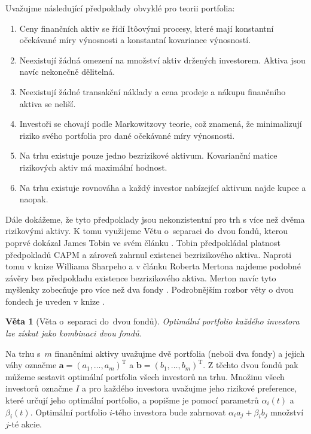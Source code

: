 \documentclass[a4paper,12pt]{report}
\newtheorem{veta}{Věta}
\theoremstyle{definition} \newtheorem{definice}[veta]{Definice}
\theoremstyle{remark}
\begin{document}
Uvažujme následující předpoklady obvyklé pro teorii portfolia:
\begin{enumerate}
\item \label{predpoklad_konstantnosti_vynosu_a_rizika} Ceny finančních aktiv se řídí It\^oovými procesy, které mají konstantní očekávané míry výnosnosti a konstantní kovariance výnosností. 
\item Neexistují žádná omezení na množství aktiv držených investorem. Aktiva jsou navíc nekonečně dělitelná.
\item Neexistují žádné transakční náklady a cena prodeje a nákupu finančního aktiva se neliší.
\item Investoři se chovají podle Markowitzovy teorie, což znamená, že minimalizují riziko svého portfolia pro dané očekávané míry výnosnosti.
\item \label{predpoklad_hodnost} Na trhu existuje pouze jedno bezrizikové aktivum. Kovarianční matice rizikových aktiv má maximální hodnost.
\item \label{predpoklad_konstantnosti_N} Na trhu existuje rovnováha a každý investor nabízející aktivum najde kupce a naopak.
\end{enumerate}

Dále dokážeme, že tyto předpoklady jsou nekonzistentní pro trh s více než dvěma rizikovými aktivy.
K tomu využijeme Větu o~separaci do~dvou fondů, kterou poprvé dokázal  James Tobin ve svém článku \cite{tobin}. 
Tobin předpokládal platnost předpokladů CAPM a zároveň zahrnul existenci bezrizikového aktiva.
Naproti tomu v knize Williama Sharpeho \cite{sharpe} a v článku Roberta Mertona \cite{merton} najdeme podobné závěry bez předpokladu existence bezrizikového aktiva.
Merton navíc tyto myšlenky zobecňuje pro více než dva fondy \cite{merton1973}.
Podrobnějším rozbor věty o dvou fondech je uveden v knize \cite{cass1970structure}.
\begin{veta}[Věta o~separaci do~dvou fondů]
Optimální portfolio každého investora lze získat jako kombinaci dvou fondů.
\end{veta}

Na trhu s~$m$ finančními aktivy uvažujme dvě portfolia (neboli dva fondy) a jejich váhy označme $\boldsymbol{a}=(a_1,\dots,a_m)^\mathrm{T}$ a $\boldsymbol{b}=(b_1,\dots,b_m)^\mathrm{T}$. Z těchto dvou fondů pak můžeme sestavit optimální portfolia všech investorů na trhu.
Množinu všech investorů označme $I$ a pro každého investora uvažujme jeho rizikové preference, které určují jeho optimální portfolio, a popišme je pomocí parametrů $\alpha_i(t)$ a $\beta_i(t)$.
Optimální portfolio $i$-tého investora bude zahrnovat $\alpha_ia_j+\beta_ib_j$ množství $j$-té akcie.
\end{document}
